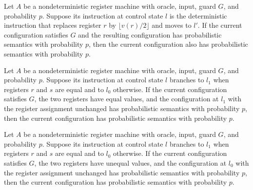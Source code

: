 \begin{lemma}
\label{Complexity.LogProg.PSem.half}
\leanok
{}
Let $A$ be a nondeterministic register machine with oracle, input, guard $G$, and
probability $p$. Suppose its instruction at control state $l$ is the deterministic
instruction that replaces register $r$ by $\lfloor v(r)/2\rfloor$ and moves to $l'$. If
the current configuration satisfies $G$ and the resulting configuration has
probabilistic semantics with probability $p$, then the current configuration also has
probabilistic semantics with probability $p$.
\end{lemma}

\begin{lemma}
\label{Complexity.LogProg.PSem.jeq_pos}
\leanok
{}
Let $A$ be a nondeterministic register machine with oracle, input, guard $G$, and
probability $p$. Suppose its instruction at control state $l$ branches to $l_1$ when
registers $r$ and $s$ are equal and to $l_0$ otherwise. If the current configuration
satisfies $G$, the two registers have equal values, and the configuration at $l_1$ with
the register assignment unchanged has probabilistic semantics with probability $p$, then
the current configuration has probabilistic semantics with probability $p$.
\end{lemma}

\begin{lemma}
\label{Complexity.LogProg.PSem.jeq_neg}
\leanok
{}
Let $A$ be a nondeterministic register machine with oracle, input, guard $G$, and
probability $p$. Suppose its instruction at control state $l$ branches to $l_1$ when
registers $r$ and $s$ are equal and to $l_0$ otherwise. If the current configuration
satisfies $G$, the two registers have unequal values, and the configuration at $l_0$
with the register assignment unchanged has probabilistic semantics with probability $p$,
then the current configuration has probabilistic semantics with probability $p$.
\end{lemma}

